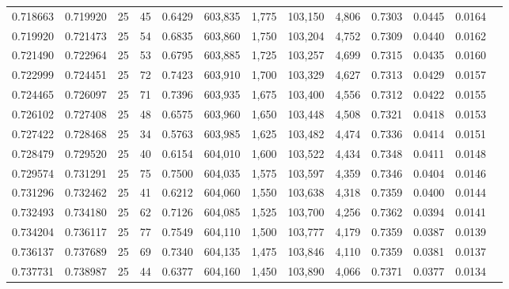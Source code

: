 \begin{tabular}{rrrrrrrrrrrrr}
0.718663 & 0.719920 &    25 &  45 &                                     0.6429 & 603,835 &   1,775 & 103,150 &   4,806 & 0.7303 & 0.0445 & 0.0164 \\
0.719920 & 0.721473 &    25 &  54 &                                     0.6835 & 603,860 &   1,750 & 103,204 &   4,752 & 0.7309 & 0.0440 & 0.0162 \\
0.721490 & 0.722964 &    25 &  53 &                                     0.6795 & 603,885 &   1,725 & 103,257 &   4,699 & 0.7315 & 0.0435 & 0.0160 \\
0.722999 & 0.724451 &    25 &  72 &                                     0.7423 & 603,910 &   1,700 & 103,329 &   4,627 & 0.7313 & 0.0429 & 0.0157 \\
0.724465 & 0.726097 &    25 &  71 &                                     0.7396 & 603,935 &   1,675 & 103,400 &   4,556 & 0.7312 & 0.0422 & 0.0155 \\
0.726102 & 0.727408 &    25 &  48 &                                     0.6575 & 603,960 &   1,650 & 103,448 &   4,508 & 0.7321 & 0.0418 & 0.0153 \\
0.727422 & 0.728468 &    25 &  34 &                                     0.5763 & 603,985 &   1,625 & 103,482 &   4,474 & 0.7336 & 0.0414 & 0.0151 \\
0.728479 & 0.729520 &    25 &  40 &                                     0.6154 & 604,010 &   1,600 & 103,522 &   4,434 & 0.7348 & 0.0411 & 0.0148 \\
0.729574 & 0.731291 &    25 &  75 &                                     0.7500 & 604,035 &   1,575 & 103,597 &   4,359 & 0.7346 & 0.0404 & 0.0146 \\
0.731296 & 0.732462 &    25 &  41 &                                     0.6212 & 604,060 &   1,550 & 103,638 &   4,318 & 0.7359 & 0.0400 & 0.0144 \\
0.732493 & 0.734180 &    25 &  62 &                                     0.7126 & 604,085 &   1,525 & 103,700 &   4,256 & 0.7362 & 0.0394 & 0.0141 \\
0.734204 & 0.736117 &    25 &  77 &                                     0.7549 & 604,110 &   1,500 & 103,777 &   4,179 & 0.7359 & 0.0387 & 0.0139 \\
0.736137 & 0.737689 &    25 &  69 &                                     0.7340 & 604,135 &   1,475 & 103,846 &   4,110 & 0.7359 & 0.0381 & 0.0137 \\
0.737731 & 0.738987 &    25 &  44 &                                     0.6377 & 604,160 &   1,450 & 103,890 &   4,066 & 0.7371 & 0.0377 & 0.0134 \\

\end{tabular}
